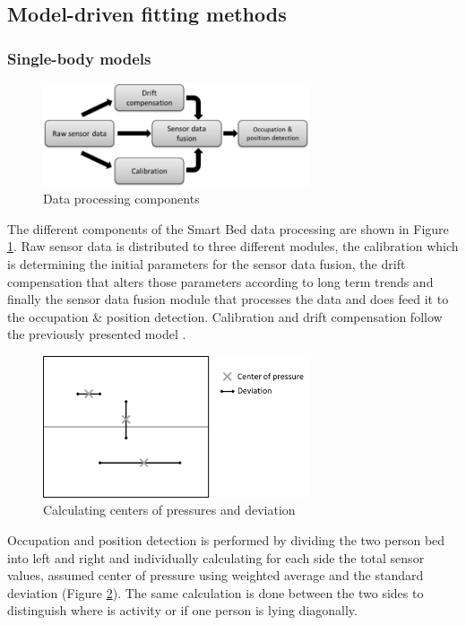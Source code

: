 \subsection{Model-driven fitting methods}
\subsubsection{Single-body models}
\begin{figure}[h]
\centering
\includegraphics[width=0.7\textwidth]{images/smartbed_proc}
\caption{Data processing components \cite{braun2012context}}
\label{fig:smartbed_proc}
\end{figure}
The different components of the Smart Bed data processing are shown in Figure \ref{fig:smartbed_proc}. Raw sensor data is distributed to three different modules, the calibration which is determining the initial parameters for the sensor data fusion, the drift compensation that alters those parameters according to long term trends and finally the sensor data fusion module that processes the data and does feed it to the occupation \& position detection. Calibration and drift compensation follow the previously presented model \cite{braun2012context}. 
\begin{figure}[h]
\centering
\includegraphics[width=0.7\textwidth]{images/smartbed_cog}
\caption{Calculating centers of pressures and deviation \cite{braun2012context}}
\label{fig:smartbed_cog}
\end{figure}
Occupation and position detection is performed by dividing the two person bed into left and right and individually calculating for each side the total sensor values, assumed center of pressure using weighted average and the standard deviation (Figure \ref{fig:smartbed_cog}). The same calculation is done between the two sides to distinguish where is activity or if one person is lying diagonally.
